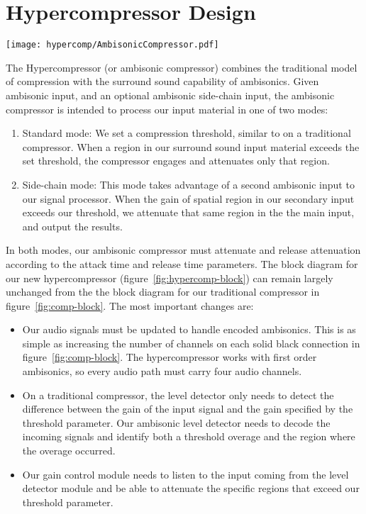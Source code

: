 \section{Hypercompressor Design}
\label{sec:hypercomp-design}
\begin{figure*}
  \texttt{[image: hypercomp/AmbisonicCompressor.pdf]}
  \caption{Hypercompressor block diagram}
  \label{fig:hypercomp-block}
\end{figure*}
\noindent The Hypercompressor (or ambisonic compressor) combines the traditional
model of compression with the surround sound capability of
ambisonics. Given ambisonic input, and an optional ambisonic
side-chain input, the ambisonic compressor is intended to process our
input material in one of two modes:
\begin{enumerate}
\item Standard mode: We set a compression threshold, similar to on a
  traditional compressor. When a region in our surround sound input
  material exceeds the set threshold, the compressor engages and
  attenuates only that region.
\item Side-chain mode: This mode takes advantage of a second ambisonic
  input to our signal processor. When the gain of spatial region in
  our secondary input exceeds our threshold, we attenuate that same
  region in the the main input, and output the results.
\end{enumerate}
In both modes, our ambisonic compressor must attenuate and release
attenuation according to the attack time and release time
parameters. The block diagram for our new hypercompressor
(figure~\ref{fig:hypercomp-block}) can remain largely unchanged from
the the block diagram for our traditional compressor in
figure~\ref{fig:comp-block}. The most important changes are:
\begin{itemize}
\item Our audio signals must be updated to handle encoded
  ambisonics. This is as simple as increasing the number of channels
  on each solid black connection in figure~\ref{fig:comp-block}. The
  hypercompressor works with first order ambisonics, so every audio
  path must carry four audio channels.
\item On a traditional compressor, the level detector only needs to
  detect the difference between the gain of the input signal and the
  gain specified by the threshold parameter. Our ambisonic level detector
  needs to decode the incoming signals and identify both a threshold
  overage and the region where the overage occurred.
\item Our gain control module needs to listen to the input coming from
  the level detector module and be able to attenuate the specific
  regions that exceed our threshold parameter.
\end{itemize}

